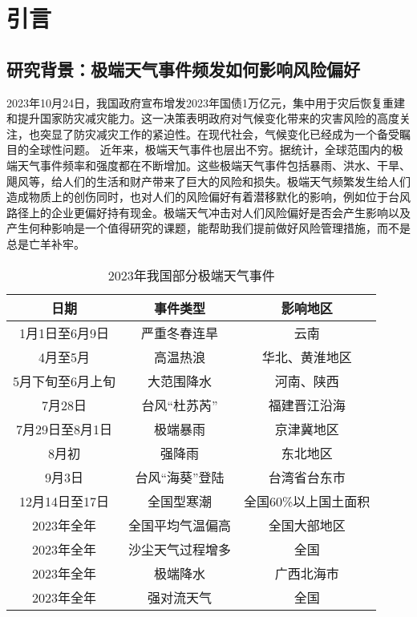 \chapter{引言}
\section{研究背景：极端天气事件频发如何影响风险偏好}

2023年10月24日，我国政府宣布增发2023年国债1万亿元，集中用于灾后恢复重建和提升国家防灾减灾能力。这一决策表明政府对气候变化带来的灾害风险的高度关注，也突显了防灾减灾工作的紧迫性。在现代社会，气候变化已经成为一个备受瞩目的全球性问题。
近年来，极端天气事件也层出不穷。据统计，全球范围内的极端天气事件频率和强度都在不断增加。这些极端天气事件包括暴雨、洪水、干旱、飓风等，给人们的生活和财产带来了巨大的风险和损失。极端天气频繁发生给人们造成物质上的创伤同时，也对人们的风险偏好有着潜移默化的影响，例如位于台风路径上的企业更偏好持有现金\citep{杨娜娜2019自然灾害与企业现金持有}。极端天气冲击对人们风险偏好是否会产生影响以及产生何种影响是一个值得研究的课题，能帮助我们提前做好风险管理措施，而不是总是亡羊补牢。

\begin{table}[H]
    \centering
    \caption{2023年我国部分极端天气事件}
    \begin{tabular}{@{}ccc@{}}
        \toprule
        \textbf{日期} & \textbf{事件类型} & \textbf{影响地区} \\
        \midrule
        1月1日至6月9日   & 严重冬春连旱        & 云南            \\
        4月至5月       & 高温热浪          & 华北、黄淮地区       \\
        5月下旬至6月上旬   & 大范围降水         & 河南、陕西     \\
        7月28日       & 台风“杜苏芮”       & 福建晋江沿海        \\
        7月29日至8月1日  & 极端暴雨          & 京津冀地区         \\
        8月初         & 强降雨           & 东北地区          \\
        9月3日        & 台风“海葵”登陆      & 台湾省台东市        \\
        12月14日至17日  & 全国型寒潮         & 全国60\%以上国土面积  \\
        2023年全年     & 全国平均气温偏高      & 全国大部地区        \\
        2023年全年    & 沙尘天气过程增多      & 全国            \\
        2023年全年       & 极端降水          & 广西北海市     \\
        2023年全年       & 强对流天气         & 全国\\
        \bottomrule
    \end{tabular}
\end{table}

